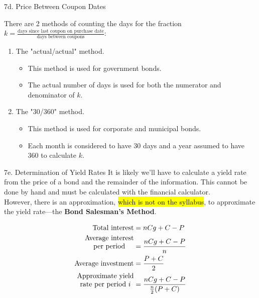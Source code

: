 \begin{CHPT_SUMM_AUTO}[label = {L.-7d}]{7d. Price Between Coupon Dates}
\tcbline

There are 2 methods of counting the days for the fraction $k = \frac{\text{days since last coupon on purchase date}}{\text{days between coupons}}$:
\begin{enumerate}[leftmargin = *]
	\item	The "actual/actual" method.
		\begin{itemize}[leftmargin = *]
		\item	This method is used for government bonds.
		\item	The actual number of days is used for both the numerator and denominator of $k$.
		\end{itemize}
	\item	The "30/360" method.
		\begin{itemize}[leftmargin = *]
		\item	This method is used for corporate and municipal bonds.
		\item	Each month is considered to have 30 days and a year assumed to have 360 to calculate $k$.
		\end{itemize}
\end{enumerate}
\end{CHPT_SUMM_AUTO}

\begin{CHPT_SUMM_AUTO}[label = {L.-7e}]{7e. Determination of Yield Rates}
It is likely we'll have to calculate a yield rate from the price of a bond and the remainder of the information. This cannot be done by hand and must be calculated with the financial calculator. \\
However, there is an approximation, \hl{which is not on the syllabus}, to approximate the yield rate---the \textbf{Bond Salesman's Method}.

\begin{align*}
	\text{Total interest}	
	&=	nCg + C - P	\\
	\text{\shortstack{Average interest\\ per period}}
	&=	\frac{nCg + C - P}{n}	\\
	\text{Average investment}
	&=	\frac{P + C}{2}	\\
	\text{\shortstack{Approximate yield\\ rate per period $i$}}
	&=	\frac{nCg + C - P}{\frac{n}{2}(P + C)}
\end{align*}
\end{CHPT_SUMM_AUTO}

